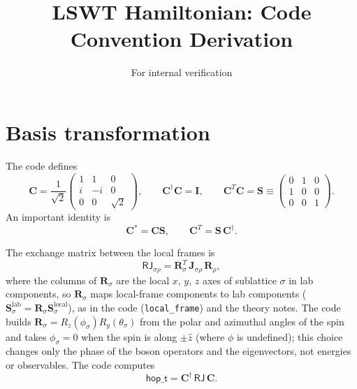 \documentclass[11pt]{article}
\title{LSWT Hamiltonian: Code Convention Derivation}
\author{For internal verification}
\date{}
\newcommand{\hop}{\mathsf{hop\_t}}
\newcommand{\dg}{^\dagger}
\begin{document}
\maketitle

\section{Basis transformation}

The code defines
\begin{equation}\label{eq:Cmat}
  \mathbf{C}
  = \frac{1}{\sqrt{2}}
    \begin{pmatrix}
      1  &  1  & 0 \\
      i  & -i  & 0 \\
      0  &  0  & \sqrt{2}
    \end{pmatrix},
  \qquad
  \mathbf{C}\dg\mathbf{C} = \mathbf{I},
  \qquad
  \mathbf{C}^T\mathbf{C}
  = \mathbf{S}
  \equiv \begin{pmatrix} 0&1&0\\1&0&0\\0&0&1 \end{pmatrix}.
\end{equation}
An important identity is
\begin{equation}\label{eq:Cstar}
  \mathbf{C}^* = \mathbf{C}\mathbf{S},
  \qquad
  \mathbf{C}^T = \mathbf{S}\,\mathbf{C}\dg.
\end{equation}

The exchange matrix between the local frames is
\begin{equation}
  \mathsf{RJ}_{\sigma\rho}
  = \mathbf{R}_\sigma^T \,\mathbf{J}_{\sigma\rho}\, \mathbf{R}_\rho,
\end{equation}
where the columns of $\mathbf{R}_\sigma$ are the local $x$, $y$, $z$ axes of
sublattice $\sigma$ in lab components, so $\mathbf{R}_\sigma$ maps local-frame
components to lab components ($\mathbf{S}^{\mathrm{lab}}_\sigma =
\mathbf{R}_\sigma \mathbf{S}^{\mathrm{local}}_\sigma$), as in the code
(\texttt{local\_frame}) and the theory notes. The code builds $\mathbf{R}_\sigma = R_z(\phi_\sigma) R_y(\theta_\sigma)$ from the polar and
azimuthal angles of the spin and takes $\phi_\sigma = 0$ when the spin is along
$\pm\hat z$ (where $\phi$ is undefined); this choice changes only the phase of
the boson operators and the eigenvectors, not energies or observables.  The code computes
\begin{equation}\label{eq:hopt}
  \boxed{\hop = \mathbf{C}\dg\, \mathsf{RJ}\, \mathbf{C}.}
\end{equation}
\end{document}
